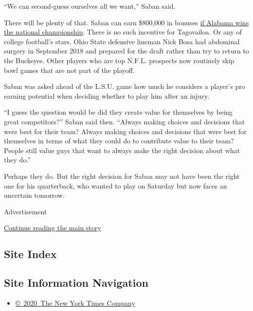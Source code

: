 ``We can second-guess ourselves all we want,'' Saban said.

There will be plenty of that. Saban can earn \$800,000 in bonuses
\href{https://www.nytimes3xbfgragh.onion/2019/11/12/sports/ncaafootball/alabama-cfp.html}{if
Alabama wins the national championship}. There is no such incentive for
Tagovailoa. Or any of college football's stars. Ohio State defensive
lineman Nick Bosa had abdominal surgery in September 2018 and prepared
for the draft rather than try to return to the Buckeyes. Other players
who are top N.F.L. prospects now routinely skip bowl games that are not
part of the playoff.

Saban was asked ahead of the L.S.U. game how much he considers a
player's pro earning potential when deciding whether to play him after
an injury.

``I guess the question would be did they create value for themselves by
being great competitors?'' Saban said then. ``Always making choices and
decisions that were best for their team? Always making choices and
decisions that were best for themselves in terms of what they could do
to contribute value to their team? People still value guys that want to
always make the right decision about what they do.''

Perhaps they do. But the right decision for Saban may not have been the
right one for his quarterback, who wanted to play on Saturday but now
faces an uncertain tomorrow.

Advertisement

\protect\hyperlink{after-bottom}{Continue reading the main story}

\hypertarget{site-index}{%
\subsection{Site Index}\label{site-index}}

\hypertarget{site-information-navigation}{%
\subsection{Site Information
Navigation}\label{site-information-navigation}}

\begin{itemize}
\tightlist
\item
  \href{https://help.nytimes3xbfgragh.onion/hc/en-us/articles/115014792127-Copyright-notice}{©~2020~The
  New York Times Company}
\end{itemize}

